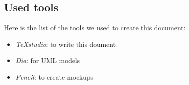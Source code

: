 \subsection{Used tools}
Here is the list of the tools we used to create this document:

\newcommand{\tool}[2]{
	\item 
		\textit{ #1}: #2	
}


\begin{itemize}
	\tool {TeXstudio}{to write this doument}
	\tool {Dia}{for UML models}
	\tool{Pencil}{to create mockups}
\end{itemize}